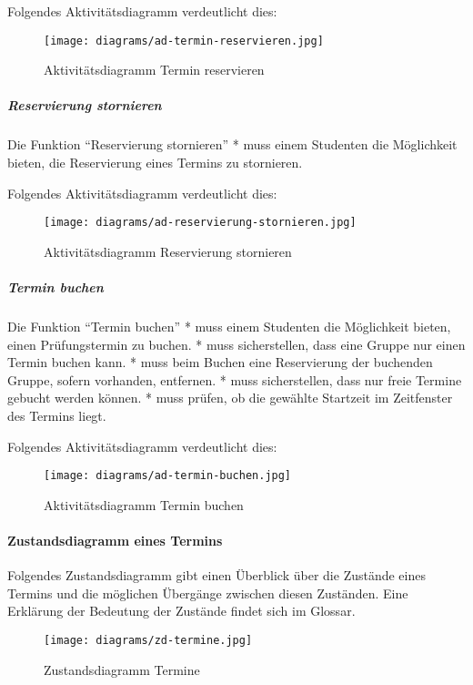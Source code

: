 \documentclass[]{article}
\let\oldparagraph\paragraph
\renewcommand{\paragraph}[1]{\oldparagraph{#1}\mbox{}}
\let\oldsubparagraph\subparagraph
\renewcommand{\subparagraph}[1]{\oldsubparagraph{#1}\mbox{}}
\begin{document}
Folgendes Aktivitätsdiagramm verdeutlicht dies:

\begin{figure}
\centering
\texttt{[image: diagrams/ad-termin-reservieren.jpg]}
\caption{Aktivitätsdiagramm Termin reservieren}
\end{figure}

\hypertarget{reservierung-stornieren}{%
\subparagraph{Reservierung stornieren}\label{reservierung-stornieren}}

Die Funktion ``Reservierung stornieren'' * muss einem Studenten die
Möglichkeit bieten, die Reservierung eines Termins zu stornieren.

Folgendes Aktivitätsdiagramm verdeutlicht dies:

\begin{figure}
\centering
\texttt{[image: diagrams/ad-reservierung-stornieren.jpg]}
\caption{Aktivitätsdiagramm Reservierung stornieren}
\end{figure}

\hypertarget{termin-buchen}{%
\subparagraph{Termin buchen}\label{termin-buchen}}

Die Funktion ``Termin buchen'' * muss einem Studenten die Möglichkeit
bieten, einen Prüfungstermin zu buchen. * muss sicherstellen, dass eine
Gruppe nur einen Termin buchen kann. * muss beim Buchen eine
Reservierung der buchenden Gruppe, sofern vorhanden, entfernen. * muss
sicherstellen, dass nur freie Termine gebucht werden können. * muss
prüfen, ob die gewählte Startzeit im Zeitfenster des Termins liegt.

Folgendes Aktivitätsdiagramm verdeutlicht dies:

\begin{figure}
\centering
\texttt{[image: diagrams/ad-termin-buchen.jpg]}
\caption{Aktivitätsdiagramm Termin buchen}
\end{figure}

\hypertarget{zustandsdiagramm-eines-termins}{%
\paragraph{Zustandsdiagramm eines
Termins}\label{zustandsdiagramm-eines-termins}}

Folgendes Zustandsdiagramm gibt einen Überblick über die Zustände eines
Termins und die möglichen Übergänge zwischen diesen Zuständen. Eine
Erklärung der Bedeutung der Zustände findet sich im Glossar.

\begin{figure}
\centering
\texttt{[image: diagrams/zd-termine.jpg]}
\caption{Zustandsdiagramm Termine}
\end{figure}
\end{document}
